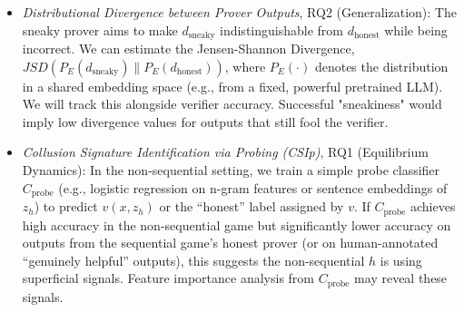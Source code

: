\begin{itemize}
    \item \emph{Distributional Divergence between Prover Outputs}, RQ2 (Generalization): The sneaky prover aims to make $d_{\text{sneaky}}$ indistinguishable from $d_{\text{honest}}$ while being incorrect. We can estimate the Jensen-Shannon Divergence, $JSD(P_E(d_{\text{sneaky}}) \| P_E(d_{\text{honest}}))$, where $P_E(\cdot)$ denotes the distribution in a shared embedding space (e.g., from a fixed, powerful pretrained LLM). We will track this alongside verifier accuracy. Successful "sneakiness" would imply low divergence values for outputs that still fool the verifier.
    \item \emph{Collusion Signature Identification via Probing (CSIp)}, RQ1 (Equilibrium Dynamics): In the non-sequential setting, we train a simple probe classifier $C_{\text{probe}}$ (e.g., logistic regression on n-gram features or sentence embeddings of $z_h$) to predict $v(x, z_h)$ or the ``honest'' label assigned by $v$. If $C_{\text{probe}}$ achieves high accuracy in the non-sequential game but significantly lower accuracy on outputs from the sequential game's honest prover (or on human-annotated ``genuinely helpful'' outputs), this suggests the non-sequential $h$ is using superficial signals. Feature importance analysis from $C_{\text{probe}}$ may reveal these signals.
\end{itemize}